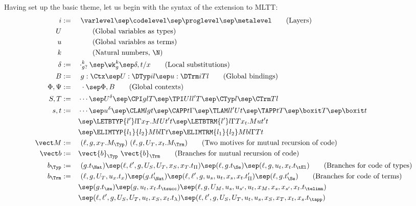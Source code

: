 Having set up the basic theme, let us begin with the syntax of the extension to MLTT:
\begin{alignat*}{2}
  i &:= &&\ \varlevel \sep \codelevel \sep \proglevel \sep \metalevel \tag{Layers} \\
  U & && \tag{Global variables as types} \\
  u & && \tag{Global variables as terms} \\
  k & && \tag{Natural numbers, $\N$} \\
  \delta &:=&& \cdot_{g?}^k \sep \wk_g^k \sep \delta, t/x \tag{Local substitutions} \\
  B &:=&&\ g : \Ctx \sep U : \DTyp i l \sep u : \DTrm i T l
          \tag{Global bindings} \\
  \Phi, \Psi &:= &&\ \cdot \sep \Phi, B \tag{Global contexts} \\
  S, T & := && \cdots \sep U^\delta \sep \CPI g l T \sep \TPI U l{l'}T \sep \CTyp l \sep \CTrm T l \\
  s, t & := && \cdots \sep u^\delta \sep \CLAM l g t \sep \CAPP t \Gamma
               \sep \TLAM l{l'} U t \sep \TAPP t T
               \sep \boxit T \sep \boxit t \\
    & && \sep \LETBTYP{l'}l\Gamma{x_T. M}{U}{t'}t \sep \LETBTRM{l'}l\Gamma
         T{x_t. M}{u}{t'}t \\
    & && \sep \ELIMTYP{l_1}{l_2}Mbl\Gamma t \sep \ELIMTRM{l_1}{l_2}Mbl\Gamma T t \\
  \vect M & := &&\ (\ell,g,x_T. M_\Typ)~(\ell,g,U_T,x_t. M_\Trm)
                  \tag{Two motives for mutual recursion of code} \\
  \vect b &:= && \vect{b}_\Typ~\vect{b}_\Trm
                 \tag{Branches for mutual recursion of code} \\
  b_\Typ &:= &&\ (g. t_\Nat) \sep (\ell,\ell',g, U_S,U_T,x_S,x_T. t_\Pi) \sep (\ell,g. t_{\Se})
                \sep (\ell,g,u_t,x_t. t_\tEl)
                       \tag{Branches for code of types} \\
  b_\Trm &:= &&\ (\ell,g,U_T,u_x. t_x) \sep (g.t'_\Nat) \sep (\ell,\ell',g,u_s,u_t,x_s,x_t.t'_\Pi) \sep
                (\ell,g.t'_\Se) 
                \tag{Branches for code of terms} \\
    & && \sep (g.t_\ze) \sep (g,u_t,x_t.t_{\tsucc}) \sep
         (\ell,g,U_M,u_s,u_{s'},u_t,x_M,x_s,x_{s'},x_t.t_{\telimn}) \\
    & && \sep (\ell,\ell',g,U_S,U_T,u_t,x_S,x_t.t_\lambda) \sep (\ell,\ell',g,U_S,U_T,u_t,u_s,x_S,x_T,x_t,x_s.t_\tapp)
\end{alignat*}
